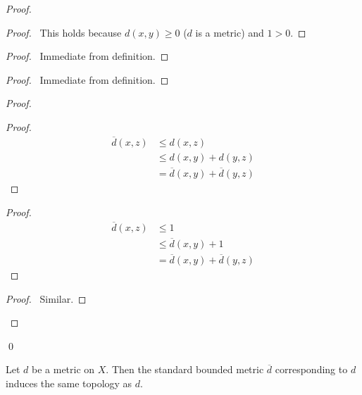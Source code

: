 \begin{proof}
  \pf
  \begin{proof}
    \pf\ This holds because $d(x, y) \geq 0$ ($d$ is a metric) and $1 > 0$.
  \end{proof}
  \begin{proof}
    \pf\ Immediate from definition.
  \end{proof}
  \begin{proof}
    \pf\ Immediate from definition.
  \end{proof}
  \begin{proof}
    \begin{proof}
      \pf
      \begin{align*}
        \overline{d}(x, z) & \leq d(x, z) \\
        & \leq d(x, y) + d(y, z) \\
        & = \overline{d}(x, y) + \overline{d}(y, z)
      \end{align*}
    \end{proof}
    \begin{proof}
      \pf
      \begin{align*}
        \overline{d}(x, z) & \leq 1 \\
        & \leq \overline{d}(x, y) + 1 \\
        & = \overline{d}(x, y) + \overline{d}(y, z)
      \end{align*}
    \end{proof}
    \begin{proof}
      \pf\ Similar.
    \end{proof}
  \end{proof}
  \qed
\end{proof}

\begin{thm}
  Let $d$ be a metric on $X$. Then the standard bounded metric $\overline{d}$
  corresponding to $d$ induces the same topology as $d$.
\end{thm}

